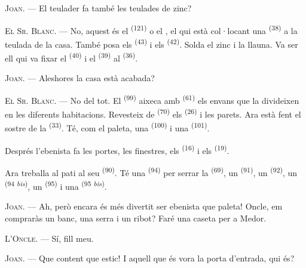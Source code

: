 \textsc{Joan}. --- El teulader fa també les teulades de zinc?

\textsc{El Sr. Blanc}. --- No, aquest és el  \textsuperscript{(121)} o el
, el qui està col·locant una
 \textsuperscript{(38)} a la teulada de la casa. També posa els
 \textsuperscript{(43)} i els 
\textsuperscript{(42)}. Solda el zinc i la llauna. Va ser ell qui va fixar el
 \textsuperscript{(40)} i el 
\textsuperscript{(39)} al  \textsuperscript{(36)}.

\textsc{Joan}. --- Aleshores la casa està acabada?

\VUsaut{3.0mm}
\VUsaut{3.0mm}

\textsc{El Sr. Blanc}. --- No del tot. El  \textsuperscript{(99)} aixeca amb
 \textsuperscript{(61)} els envans que la divideixen en les diferents
habitacions. Revesteix de  \textsuperscript{(70)} els 
\textsuperscript{(26)} i les parets. Ara està fent el sostre de la 
\textsuperscript{(33)}. Té, com el paleta, una  \textsuperscript{(100)} i una
 \textsuperscript{(101)}.

Després l'ebenista fa les portes, les finestres, els  \textsuperscript{(16)}
i els  \textsuperscript{(19)}.

Ara treballa al pati al seu  \textsuperscript{(90)}. Té una
 \textsuperscript{(94)} per serrar la 
\textsuperscript{(69)}, un  \textsuperscript{(91)}, un
 \textsuperscript{(92)}, un 
\textsuperscript{(94 \textit{bis})}, un  \textsuperscript{(95)} i una
 \textsuperscript{(95 \textit{bis})}.

\textsc{Joan}. --- Ah, però encara és més divertit ser ebenista que paleta! Oncle, em
compraràs un banc, una serra i un ribot? Faré una caseta per a Medor.

\textsc{L'Oncle}. --- Sí, fill meu.

\textsc{Joan}. --- Que content que estic! I aquell que és vora la porta d'entrada, qui és?

\VUsaut{3.0mm}
\VUsaut{3.0mm}

